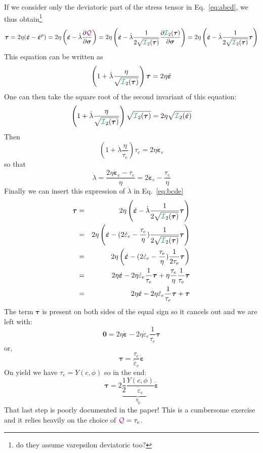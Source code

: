 If we consider only the deviatoric part of the stress tensor in Eq.~\eqref{eq:abcd}, we thus obtain\footnote{do they assume varepsilon deviatoric too?}
\begin{equation}
\bm \tau = 2 \eta (\dot{\bm \varepsilon} -\dot{\bm \varepsilon}^p)
= 2 \eta \left(\dot{\bm \varepsilon} - \dot\lambda \frac{\partial \QQQ}{\partial \bm\sigma} \right)
= 2 \eta \left(\dot{\bm \varepsilon} - \dot\lambda \frac{1}{2 \sqrt{ {\III}_2(\bm\tau)}}  \frac{\partial {\III}_2(\bm\tau)}{\partial \bm\sigma} \right)
= 
2 \eta \left(\dot{\bm \varepsilon} - \dot\lambda \frac{1}{2 \sqrt{ {\III}_2(\bm\tau)}} \bm\tau \right) \label{eq:bcde}
\end{equation}
This equation can be written as
\[
\left( 1 + \dot\lambda \frac{\eta }{ \sqrt{ {\III}_2(\bm\tau)}} \right) \bm\tau
= 2 \eta \dot{\bm \varepsilon}
\]
One can then take the square root of the second invariant of this equation:
\[
\left( 1 + \dot\lambda \frac{\eta }{ \sqrt{ {\III}_2(\bm\tau)}} \right) 
\sqrt{{\III}_2(\bm\tau) }= 2 \eta \sqrt{{\III}_2(\dot{\bm \varepsilon})}
\]
Then 
\[
\left( 1 + \dot\lambda \frac{\eta }{ \tau_e} \right) 
\tau_e = 2 \eta \dot{\bm \varepsilon}_e
\]
so that 
\[
\dot\lambda 
= \frac{2 \eta \dot{\bm \varepsilon}_e - \tau_e}{\eta}
= 2 \dot{\bm \varepsilon}_e - \frac{\tau_e}{\eta}
\]
Finally we can insert this expression of $\dot\lambda$ in Eq.~\eqref{eq:bcde}
\begin{eqnarray}
\bm \tau 
&=&2 \eta \left(\dot{\bm \varepsilon} - \dot\lambda \frac{1}{2 \sqrt{ {\III}_2(\bm\tau)}} \bm\tau \right)  \\
&=& 2 \eta \left(\dot{\bm \varepsilon} -    
(2 \dot{ \varepsilon}_e - \frac{\tau_e}{\eta})
\frac{1}{2 \sqrt{ {\III}_2(\bm\tau)}} \bm\tau \right)  \\
&=& 2 \eta \left(\dot{\bm \varepsilon} -  
(2 \dot{ \varepsilon}_e - \frac{\tau_e}{\eta})   \frac{1}{2 \tau_e} \bm\tau \right) \\
&=& 2 \eta \dot{\bm \varepsilon} -  
2\eta \dot{\varepsilon}_e \frac{1}{ \tau_e} \bm\tau 
+ \eta \frac{\tau_e}{\eta}   \frac{1}{ \tau_e} \bm\tau \\
&=& 2 \eta \dot{\bm \varepsilon} -  
2\eta \dot{\varepsilon}_e \frac{1}{ \tau_e} \bm\tau +  \bm\tau \\
\end{eqnarray}
The term $\bm\tau$ is present on both sides of the equal sign so it cancels out
and we are left with:
\[
\bm 0 = 2 \eta \dot{\bm \varepsilon} -  
2\eta \dot{\varepsilon}_e \frac{1}{ \tau_e} \bm\tau 
\]
or,
\[
\bm\tau = \frac{\tau_e}{\dot{\varepsilon}_e}  \dot{\bm \varepsilon}
\]
On yield we have $\tau_e=Y(c,\phi)$ so in the end:
\[
{\bm\tau} = 2 \underbrace{
\frac12 \frac{Y(c,\phi)}{ \dot{\varepsilon}_e} 
}_{\eta_p}  \dot{\bm \varepsilon}
\]
That last step is poorly documented in the paper!
This is a cumbersome exercise and it relies heavily on the choice of ${\color{violet}\cal Q}=\tau_e$.


